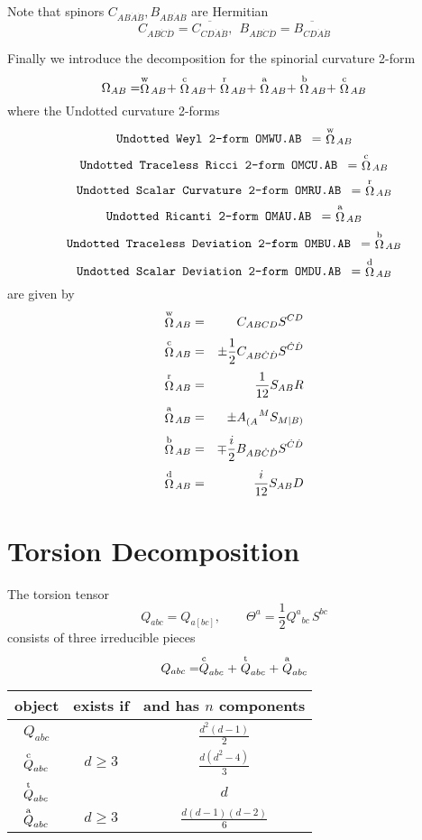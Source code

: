 \documentclass[twoside,openright]{report}
\newcommand{\grgtt}{\ttfamily}
\newcommand{\object}[2]{%
\begin{equation}
\mbox{\comm{#1}} =\ #2
\end{equation}}
\newcommand{\vv}{\vphantom{\rule{5mm}{5mm}}}
\newcommand{\OO}[1]{\stackrel{\rm #1}{\Omega}\!{}}
\renewcommand{\tt}{\grgtt}
\newcommand{\comm}[1]{{\upshape\tt#1}}    %
\begin{document}
Note that spinors $C_{AB\dot{A}\dot{B}},B_{AB\dot{A}\dot{B}}$ are Hermitian
\begin{equation}
C_{AB\dot{C}\dot{D}}=\overline{C_{CD\dot{A}\dot{B}}},\ \
B_{AB\dot{C}\dot{D}}=\overline{B_{CD\dot{A}\dot{B}}}
\end{equation}

Finally we introduce the decomposition for the spinorial
curvature 2-form
\begin{equation}
\Omega_{AB}=
\OO{w}_{AB}+\OO{c}_{AB}+\OO{r}_{AB}
+\OO{a}_{AB}+\OO{b}_{AB}+\OO{c}_{AB}
\end{equation}
where the {\tt Undotted curvature 2-forms}
\object{Undotted Weyl 2-form                 OMWU.AB }{\OO{w}_{AB}}
\object{Undotted Traceless Ricci 2-form      OMCU.AB }{\OO{c}_{AB}}
\object{Undotted Scalar Curvature 2-form     OMRU.AB }{\OO{r}_{AB}}
\object{Undotted Ricanti 2-form              OMAU.AB }{\OO{a}_{AB}}
\object{Undotted Traceless Deviation 2-form  OMBU.AB }{\OO{b}_{AB}}
\object{Undotted Scalar Deviation 2-form     OMDU.AB }{\OO{d}_{AB}}
are given by
\begin{eqnarray}
\OO{w}_{AB}&=&C_{ABCD}S^{CD}  \\[1mm]
\OO{c}_{AB}&=&\pm\frac12 C_{AB\dot{C}\dot{D}}S^{\dot{C}\dot{D}} \\[1mm]
\OO{r}_{AB}&=&\frac1{12}S_{AB}R \\[1mm]
\OO{a}_{AB}&=&\pm A_{(A}^{\ \ \ M}S_{M|B)} \\[1mm]
\OO{b}_{AB}&=&\mp\frac{i}2 B_{AB\dot{C}\dot{D}}S^{\dot{C}\dot{D}} \\[1mm]
\OO{d}_{AB}&=&\frac{i}{12}S_{AB}D
\end{eqnarray}







\section{Torsion Decomposition}

The torsion tensor
\begin{equation}
Q_{abc}=Q_{a[bc]},\qquad
\Theta^a=\frac{1}{2}Q^a{}_{bc}\,S^{bc}
\end{equation}
consists of three irreducible pieces
\begin{equation}
Q_{abc} =
\stackrel{\rm c}{Q}_{abc}
+\stackrel{\rm t}{Q}_{abc}
+\stackrel{\rm a}{Q}_{abc}
\end{equation}

\begin{center}
\begin{tabular}{|c|c|c|}
\hline object & exists if & and has $n$ components \\
\hline
\vv$Q_{abc}$ &  & $\frac{d^2(d-1)}{2}$ \\[1mm]
\hline\vv$\stackrel{\rm c}{Q}_{abc}$ & $d\geq3$ & $\frac{d(d^2-4)}{3}$ \\
\vv$\stackrel{\rm t}{Q}_{abc}$ &          & $d$ \\
\vv$\stackrel{\rm a}{Q}_{abc}$ & $d\geq3$ & $\frac{d(d-1)(d-2)}{6}$ \\[1mm]
\hline
\end{tabular}
\end{center}
\end{document}
